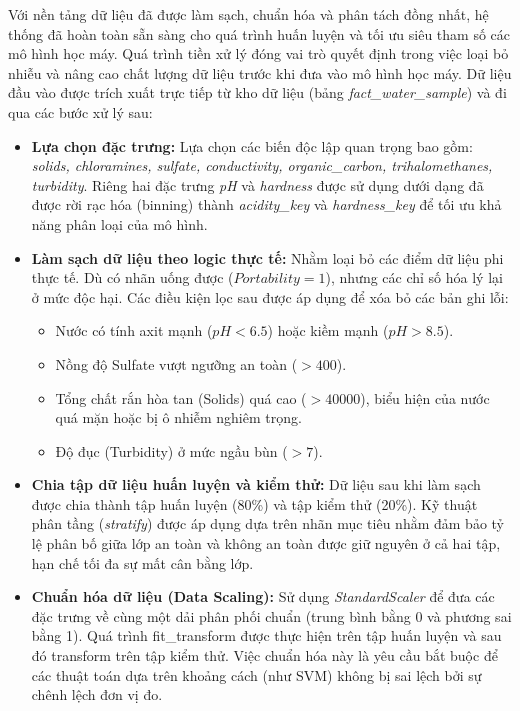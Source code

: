 \hspace{17pt}Với nền tảng dữ liệu đã được làm sạch, chuẩn hóa và phân tách đồng nhất, hệ thống đã hoàn toàn sẵn sàng cho quá trình huấn luyện và tối ưu siêu tham số các mô hình học máy.
Quá trình tiền xử lý đóng vai trò quyết định trong việc loại bỏ nhiễu và nâng cao chất lượng dữ liệu trước khi đưa vào mô hình học máy. Dữ liệu đầu vào được trích xuất trực tiếp từ kho dữ liệu (bảng \textit{fact\_water\_sample}) và đi qua các bước xử lý sau:

\begin{itemize}
    \item \textbf{Lựa chọn đặc trưng:} Lựa chọn các biến độc lập quan trọng bao gồm: \textit{solids, chloramines, sulfate, conductivity, organic\_carbon, trihalomethanes, turbidity}. Riêng hai đặc trưng \textit{pH} và \textit{hardness} được sử dụng dưới dạng đã được rời rạc hóa (binning) thành \textit{acidity\_key} và \textit{hardness\_key} để tối ưu khả năng phân loại của mô hình.
    
    \item \textbf{Làm sạch dữ liệu theo logic thực tế:} Nhằm loại bỏ các điểm dữ liệu phi thực tế. Dù có nhãn uống được (\textit{$Portability = 1$}), nhưng các chỉ số hóa lý lại ở mức độc hại. Các điều kiện lọc sau được áp dụng để xóa bỏ các bản ghi lỗi:
    \begin{itemize}
        \item Nước có tính axit mạnh ($pH<6.5$) hoặc kiềm mạnh ($pH> 8.5$).
        \item Nồng độ Sulfate vượt ngưỡng an toàn ($>400$).
        \item Tổng chất rắn hòa tan (Solids) quá cao ($>40000$), biểu hiện của nước quá mặn hoặc bị ô nhiễm nghiêm trọng.
        \item Độ đục (Turbidity) ở mức ngầu bùn ($>7$).
    \end{itemize}
    
    \item \textbf{Chia tập dữ liệu huấn luyện và kiểm thử:} Dữ liệu sau khi làm sạch được chia thành tập huấn luyện (80\%) và tập kiểm thử (20\%). Kỹ thuật phân tầng (\textit{stratify}) được áp dụng dựa trên nhãn mục tiêu nhằm đảm bảo tỷ lệ phân bố giữa lớp an toàn và không an toàn được giữ nguyên ở cả hai tập, hạn chế tối đa sự mất cân bằng lớp.
    
    \item \textbf{Chuẩn hóa dữ liệu (Data Scaling):} Sử dụng \textit{StandardScaler} để đưa các đặc trưng về cùng một dải phân phối chuẩn (trung bình bằng 0 và phương sai bằng 1). Quá trình fit\_transform được thực hiện trên tập huấn luyện và sau đó transform trên tập kiểm thử. Việc chuẩn hóa này là yêu cầu bắt buộc để các thuật toán dựa trên khoảng cách (như SVM) không bị sai lệch bởi sự chênh lệch đơn vị đo.
\end{itemize}

